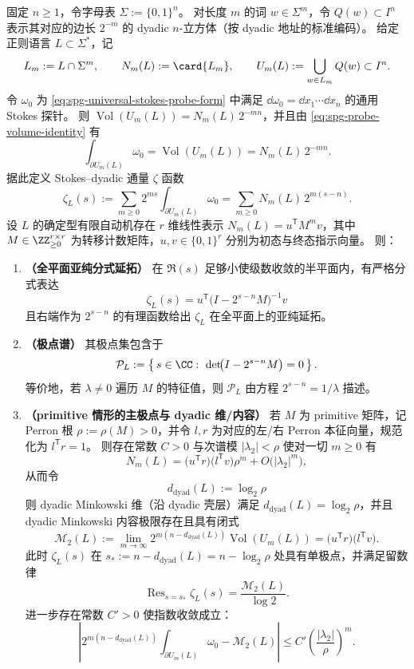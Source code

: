 \begin{proposition}\label{prop:spg-regular-language-stokes-dyadic-zeta-rationality}
固定 \(n\ge 1\)，令字母表 \(\Sigma:=\{0,1\}^n\)。
对长度 \(m\) 的词 \(w\in\Sigma^m\)，令 \(Q(w)\subset I^n\) 表示其对应的边长 \(2^{-m}\) 的 dyadic \(n\)-立方体（按 dyadic 地址的标准编码）。
给定正则语言 \(L\subset\Sigma^\ast\)，记
\[
L_m:=L\cap\Sigma^m,
\qquad
N_m(L):=\card{L_m},
\qquad
U_m(L):=\bigcup_{w\in L_m}Q(w)\subset I^n.
\]
令 \(\omega_0\) 为 \eqref{eq:spg-universal-stokes-probe-form} 中满足 \(\dd\omega_0=\dd x_1\cdots \dd x_n\) 的通用 Stokes 探针。
则 \(\operatorname{Vol}(U_m(L))=N_m(L)\,2^{-mn}\)，并且由 \eqref{eq:spg-probe-volume-identity} 有
\[
\int_{\partial U_m(L)}\omega_0=\operatorname{Vol}(U_m(L))=N_m(L)\,2^{-mn}.
\]
据此定义 Stokes--dyadic 通量 \(\zeta\) 函数
\[
\zeta_L(s):=\sum_{m\ge 0}2^{ms}\int_{\partial U_m(L)}\omega_0
=\sum_{m\ge 0}N_m(L)\,2^{m(s-n)}.
\]
设 \(L\) 的确定型有限自动机存在 \(r\) 维线性表示 \(N_m(L)=u^{\mathsf T}M^m v\)，其中
\(
M\in\ZZ_{\ge 0}^{r\times r}
\)
为转移计数矩阵，\(u,v\in\{0,1\}^r\) 分别为初态与终态指示向量。
则：
\begin{enumerate}
  \item \textbf{（全平面亚纯分式延拓）}
        在 \(\Re(s)\) 足够小使级数收敛的半平面内，有严格分式表达
        \[
        \boxed{\;
        \zeta_L(s)=u^{\mathsf T}\bigl(I-2^{s-n}M\bigr)^{-1}v\;}
        \]
        且右端作为 \(2^{s-n}\) 的有理函数给出 \(\zeta_L\) 在全平面上的亚纯延拓。
  \item \textbf{（极点谱）}
        其极点集包含于
        \[
        \mathcal P_L:=\left\{\,s\in\CC:\ \det\!\bigl(I-2^{s-n}M\bigr)=0\,\right\}.
        \]
        等价地，若 \(\lambda\neq 0\) 遍历 \(M\) 的特征值，则 \(\mathcal P_L\) 由方程 \(2^{s-n}=1/\lambda\) 描述。
  \item \textbf{（primitive 情形的主极点与 dyadic 维/内容）}
        若 \(M\) 为 primitive 矩阵，记 Perron 根 \(\rho:=\rho(M)>0\)，并令 \(l,r\) 为对应的左/右 Perron 本征向量，规范化为 \(l^{\mathsf T}r=1\)。
        则存在常数 \(C>0\) 与次谱模 \(|\lambda_2|<\rho\) 使对一切 \(m\ge 0\) 有
        \[
        N_m(L)=\bigl(u^{\mathsf T}r\bigr)\bigl(l^{\mathsf T}v\bigr)\rho^m+O\!\bigl(|\lambda_2|^m\bigr),
        \]
        从而令
        \[
        d_{\mathrm{dyad}}(L):=\log_2\rho
        \]
        则 dyadic Minkowski 维（沿 dyadic 壳层）满足 \(d_{\mathrm{dyad}}(L)=\log_2\rho\)，并且 dyadic Minkowski 内容极限存在且具有闭式
        \[
        \mathcal M_2(L):=\lim_{m\to\infty}2^{m(n-d_{\mathrm{dyad}}(L))}\operatorname{Vol}(U_m(L))
        =\bigl(u^{\mathsf T}r\bigr)\bigl(l^{\mathsf T}v\bigr).
        \]
        此时 \(\zeta_L(s)\) 在
        \(
        s_\ast:=n-d_{\mathrm{dyad}}(L)=n-\log_2\rho
        \)
        处具有单极点，并满足留数律
        \[
        \operatorname{Res}_{s=s_\ast}\zeta_L(s)=\frac{\mathcal M_2(L)}{\log 2}.
        \]
        进一步存在常数 \(C'>0\) 使指数收敛成立：
        \[
        \left|2^{m(n-d_{\mathrm{dyad}}(L))}\int_{\partial U_m(L)}\omega_0-\mathcal M_2(L)\right|
        \le C'\left(\frac{|\lambda_2|}{\rho}\right)^m.
        \]
\end{enumerate}
\end{proposition}

